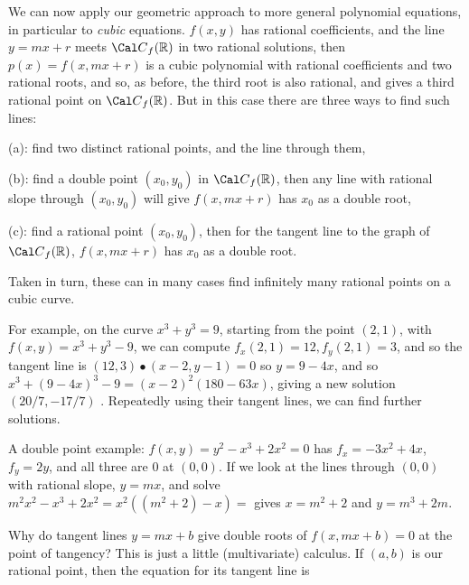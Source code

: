 
\ssk


\msk


We can now apply our geometric approach to more general polynomial
equations, in particular to {\it cubic} equations. $f(x,y)$ has
rational coefficients, and the line $y=mx+r$ meets ${\Cal C}_f({\Bbb R})$
in two rational solutions, then $p(x)=f(x,mx+r)$ is a cubic polynomial
with rational coefficients and two rational roots, and so,
as before, the third root is also rational, and gives a third 
rational point on ${\Cal C}_f({\Bbb R})$. But in this case there
are three ways to find such lines:

\ssk

(a): find two distinct rational points, and the line through them,

(b): find a double point $(x_0,y_0)$ in ${\Cal C}_f({\Bbb R})$, then any line
with rational slope through $(x_0,y_0)$ will give $f(x,mx+r)$ has $x_0$ as
a double root,

(c): find a rational point $(x_0,y_0)$, then for the tangent line to the graph 
of ${\Cal C}_f({\Bbb R})$, $f(x,mx+r)$ has $x_0$ as a double root.

\ssk

Taken in turn, these can in many cases find infinitely many rational 
points on a cubic curve.

\msk

For example, on the curve $x^3+y^3=9$, starting from the 
point $(2,1)$, with $f(x,y)=x^3+y^3-9$, we can compute 
$f_x(2,1) = 12 , f_y(2,1) = 3$, and so the tangent line is
$(12,3)\bullet(x-2,y-1)=0$ so $y=9-4x$, and so $x^3+(9-4x)^3-9 = (x-2)^2(180-63x)$,
giving a new solution $(20/7,-17/7)$ . Repeatedly using their tangent lines, 
we can find further solutions. 

\ssk

A double point example: $f(x,y)=y^2-x^3+2x^2=0$ has $f_x=-3x^2+4x$, $f_y=2y$,
and all three are 0 at $(0,0)$. If we look at the lines through $(0,0)$ with rational
slope, $y=mx$, and solve $m^2x^2-x^3+2x^2 = x^2((m^2+2)-x) = $ gives
$x=m^2+2$ and $y=m^3+2m$.

\msk

Why do tangent lines $y=mx+b$ give double roots of $f(x,mx+b)=0$ at
the point of tangency? This is just a little (multivariate) calculus. If $(a,b)$
is our rational point, then the equation for its tangent line is

